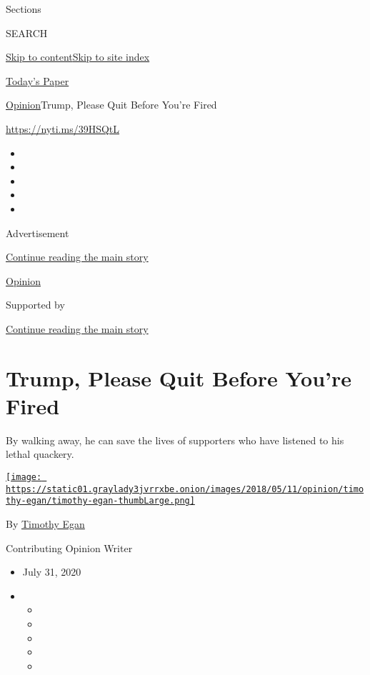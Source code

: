 Sections

SEARCH

\protect\hyperlink{site-content}{Skip to
content}\protect\hyperlink{site-index}{Skip to site index}

\href{https://myaccount.nytimes3xbfgragh.onion/auth/login?response_type=cookie\&client_id=vi}{}

\href{https://www.nytimes3xbfgragh.onion/section/todayspaper}{Today's
Paper}

\href{/section/opinion}{Opinion}\textbar{}Trump, Please Quit Before
You're Fired

\url{https://nyti.ms/39HSQtL}

\begin{itemize}
\item
\item
\item
\item
\item
\end{itemize}

Advertisement

\protect\hyperlink{after-top}{Continue reading the main story}

\href{/section/opinion}{Opinion}

Supported by

\protect\hyperlink{after-sponsor}{Continue reading the main story}

\hypertarget{trump-please-quit-before-youre-fired}{%
\section{Trump, Please Quit Before You're
Fired}\label{trump-please-quit-before-youre-fired}}

By walking away, he can save the lives of supporters who have listened
to his lethal quackery.

\href{https://www.nytimes3xbfgragh.onion/by/timothy-egan}{\texttt{[image: https://static01.graylady3jvrrxbe.onion/images/2018/05/11/opinion/timothy-egan/timothy-egan-thumbLarge.png]}}

By \href{https://www.nytimes3xbfgragh.onion/by/timothy-egan}{Timothy
Egan}

Contributing Opinion Writer

\begin{itemize}
\item
  July 31, 2020
\item
  \begin{itemize}
  \item
  \item
  \item
  \item
  \item
  \end{itemize}
\end{itemize}

